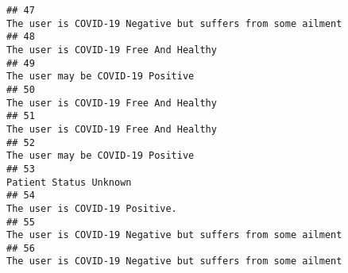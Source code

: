 \documentclass[
]{article}
\begin{document}
\begin{verbatim}
## 47                                                                                                                                                                                                         The user is COVID-19 Negative but suffers from some ailment
## 48                                                                                                                                                                                                                               The user is COVID-19 Free And Healthy
## 49                                                                                                                                                                                                                                   The user may be COVID-19 Positive
## 50                                                                                                                                                                                                                               The user is COVID-19 Free And Healthy
## 51                                                                                                                                                                                                                               The user is COVID-19 Free And Healthy
## 52                                                                                                                                                                                                                                   The user may be COVID-19 Positive
## 53                                                                                                                                                                                                                                              Patient Status Unknown
## 54                                                                                                                                                                                                                                      The user is COVID-19 Positive.
## 55                                                                                                                                                                                                         The user is COVID-19 Negative but suffers from some ailment
## 56                                                                                                                                                                                                         The user is COVID-19 Negative but suffers from some ailment

\end{verbatim}
\end{document}

